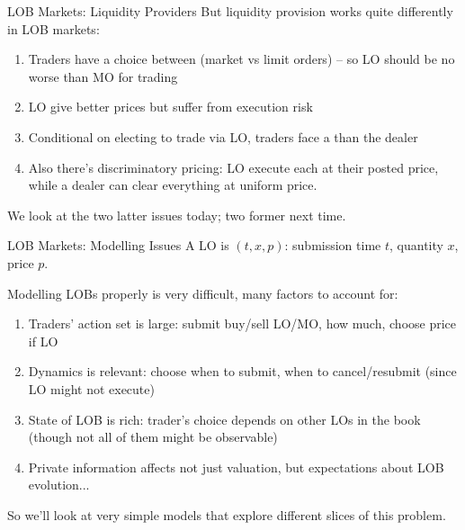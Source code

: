 \documentclass[english,10pt
,aspectratio=169
]{beamer}
\begin{document}
\begin{frame}{LOB Markets: Liquidity Providers}
	But \alert{liquidity provision} works quite differently in LOB markets:
	\begin{enumerate}
		\item Traders have a choice between  (market vs limit orders) -- so LO should be no worse than MO for trading
		\item LO give better prices but suffer from execution risk
		\item Conditional on electing to trade via LO, traders face a  than the dealer
		\item Also there's discriminatory pricing: LO execute each at their posted price, while a dealer can clear everything at uniform price.
	\end{enumerate}
	We look at the two latter issues today; two former next time.
\end{frame}


\begin{frame}{LOB Markets: Modelling Issues}
	A LO is $(t,x,p)$: submission time $t$, quantity $x$, price $p$.
	
	Modelling LOBs properly is very difficult, many factors to account for:
	\begin{enumerate}
		\item Traders' action set is large: submit buy/sell LO/MO, how much, choose price if LO
		\item Dynamics is relevant: choose when to submit, when to cancel/resubmit (since LO might not execute)
		\item State of LOB is rich: trader's choice depends on other LOs in the book (though not all of them might be observable)
		\item Private information affects not just valuation, but expectations about LOB evolution...
	\end{enumerate}
	So we'll look at very simple models that explore different slices of this problem.
\end{frame}
\end{document}
